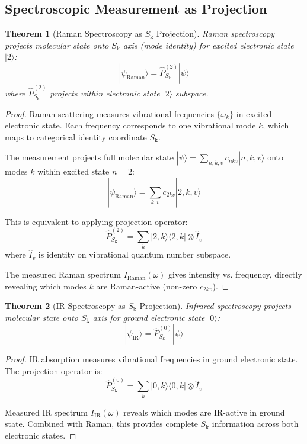 \documentclass[twocolumn,10pt]{article}
\newtheorem{theorem}{Theorem}[section]
\newcommand{\Sk}{S_{\text{k}}}
\begin{document}
\subsection{Spectroscopic Measurement as Projection}

\begin{theorem}[Raman Spectroscopy as $\Sk$ Projection]
\label{thm:raman_projection}
Raman spectroscopy projects molecular state onto $\Sk$ axis (mode identity) for excited electronic state $|2\rangle$:
\begin{equation}
|\psi_{\text{Raman}}\rangle = \hat{P}_{\Sk}^{(2)} |\psi\rangle
\end{equation}
where $\hat{P}_{\Sk}^{(2)}$ projects within electronic state $|2\rangle$ subspace.
\end{theorem}

\begin{proof}
Raman scattering measures vibrational frequencies $\{\omega_k\}$ in excited electronic state. Each frequency corresponds to one vibrational mode $k$, which maps to categorical identity coordinate $\Sk$.

The measurement projects full molecular state $|\psi\rangle = \sum_{n,k,v} c_{nkv} |n,k,v\rangle$ onto modes $k$ within excited state $n=2$:
\begin{equation}
|\psi_{\text{Raman}}\rangle = \sum_{k,v} c_{2kv} |2,k,v\rangle
\end{equation}

This is equivalent to applying projection operator:
\begin{equation}
\hat{P}_{\Sk}^{(2)} = \sum_k |2,k\rangle\langle 2,k| \otimes \hat{I}_v
\end{equation}
where $\hat{I}_v$ is identity on vibrational quantum number subspace.

The measured Raman spectrum $I_{\text{Raman}}(\omega)$ gives intensity vs. frequency, directly revealing which modes $k$ are Raman-active (non-zero $c_{2kv}$).
\end{proof}

\begin{theorem}[IR Spectroscopy as $\Sk$ Projection]
\label{thm:ir_projection}
Infrared spectroscopy projects molecular state onto $\Sk$ axis for ground electronic state $|0\rangle$:
\begin{equation}
|\psi_{\text{IR}}\rangle = \hat{P}_{\Sk}^{(0)} |\psi\rangle
\end{equation}
\end{theorem}

\begin{proof}
IR absorption measures vibrational frequencies in ground electronic state. The projection operator is:
\begin{equation}
\hat{P}_{\Sk}^{(0)} = \sum_k |0,k\rangle\langle 0,k| \otimes \hat{I}_v
\end{equation}

Measured IR spectrum $I_{\text{IR}}(\omega)$ reveals which modes are IR-active in ground state. Combined with Raman, this provides complete $\Sk$ information across both electronic states.
\end{proof}
\end{document}
